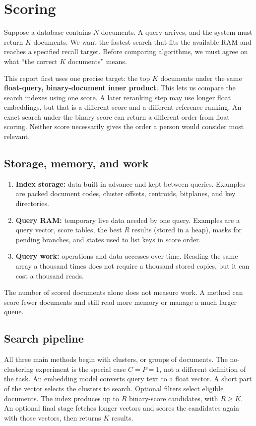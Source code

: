 \section{Scoring}
\label{sec:foundations}
Suppose a database contains $N$ documents. A query arrives, and the system must return $K$
documents. We want the fastest search that fits the available RAM and reaches a
specified recall target. Before comparing algorithms, we must agree on what ``the correct
$K$ documents'' means.

This report first uses one precise target: the top $K$ documents under the same
\textbf{float-query, binary-document inner product}. This lets us compare the search indexes using one score. A later
reranking step may use longer float embeddings, but that is a different score and a different
reference ranking. An exact search under the binary score can return a different order from float scoring.
Neither score necessarily gives the order a person would consider most relevant.

\subsection{Storage, memory, and work}
\begin{enumerate}
\item \textbf{Index storage:} data built in advance and kept between queries. Examples are
packed document codes, cluster offsets, centroids, bitplanes, and key directories.
\item \textbf{Query RAM:} temporary live data needed by one query. Examples are a query vector,
score tables, the best $R$ results (stored in a heap), masks for pending branches, and states used to
list keys in score order.
\item \textbf{Query work:} operations and data accesses over time. Reading the same array a
thousand times does not require a thousand stored copies, but it can cost a thousand reads.
\end{enumerate}
The number of scored documents alone does not measure work. A method can score fewer documents
and still read more memory or manage a much larger queue.

\subsection{Search pipeline}
All three main methods begin with clusters, or groups of documents. The no-clustering experiment is the special
case $C=P=1$, not a different definition of the task.
An embedding model converts query text to a float vector. A short part of the vector selects the
clusters to search. Optional filters select eligible documents. The index produces
up to $R$ binary-score candidates, with $R\geq K$. An optional final stage fetches longer
vectors and scores the candidates again with those vectors, then returns $K$ results.


